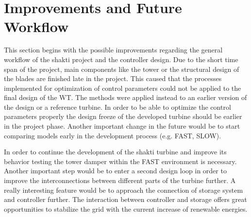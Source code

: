\section{Improvements and Future Workflow}
This section begins with the possible improvements regarding the general workflow of the \gls{shakti} project and the controller design.
Due to the short time span of the project, main components like the tower or the structural design of the blades are finished late in the project.
This caused that the processes implemented for optimization of control parameters could not be applied to the final design of the \gls{WT}.
The methods were applied instead to an earlier version of the design or a reference turbine.
In order to be able to optimize the control parameters properly the design freeze of the developed turbine should be earlier in the project phase.
Another important change in the future would be to start comparing models early in the development process (e.g. FAST, SLOW).

In order to continue the development of the \gls{shakti} turbine and improve its behavior testing the tower damper within the FAST environment is necessary.
Another important step would be to enter a second design loop in order to improve the interconnections between different parts of the turbine further.
A really interesting feature would be to approach the connection of storage system and controller further.
The interaction between controller and storage offers great opportunities to stabilize the grid with the current increase of renewable energies.
